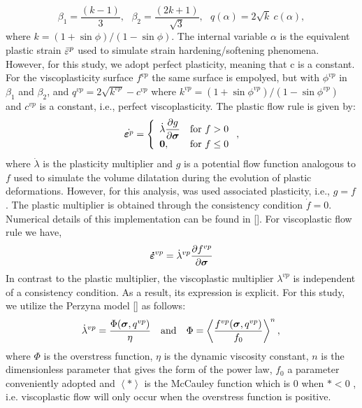 \documentclass[a4paper,fleqn]{cas-sc}
\begin{document}
\begin{equation}
	\label{eq:f_DP_inscrita_MC}
	\beta_1 = \dfrac{(k-1)}{3}, ~~~ \beta_2 = \dfrac{(2k+1)}{\sqrt{3}}, ~~~
	q(\alpha) = 2\sqrt{k}~c(\alpha),
\end{equation}
where $k = (1+\sin{\phi})/(1-\sin{\phi})$. The internal variable $\alpha$ is the equivalent plastic strain $\bar \varepsilon^p$ used to simulate strain hardening/softening phenomena. However, for this study, we adopt perfect plasticity, meaning that c is a constant. For the viscoplasticity surface $f^{vp}$ the same surface is empolyed, but with $\phi^{vp}$ in $\beta_1$ and $\beta_2$, and $q^{vp} = 2\sqrt{k^{vp}}-c^{vp}$ where $k^{vp} = (1+\sin{\phi^{vp}})/(1-\sin{\phi^{vp}})$ and $c^{vp}$ is a constant, i.e., perfect viscoplasticity. 
The plastic flow rule is given by:
\begin{equation}
	\label{eq_plastic_flow}
	\dot {\boldsymbol{\varepsilon}^{p}} = \left\{ 
	\begin{array}{ll} 
		\dot \lambda \dfrac{\partial g}{\partial \boldsymbol{\sigma}} &  \text{for } f > 0 \\ 
		\boldsymbol 0, & \text{for } f \le 0 \\
	\end{array}\right.,
\end{equation}
where $\dot \lambda$ is the plasticity multiplier and $g$ is a potential flow function analogous to $f$ used to simulate the volume dilatation during the evolution of plastic deformations. However, for this analysis, was used associated plasticity, i.e., $g=f$. The plastic multiplier is obtained through the consistency condition $\dot f = 0$. Numerical details of this implementation can be found in []. For viscoplastic flow rule we have,
\begin{equation}
	\label{eq_viscoplastic_flow}
	\boldsymbol{\dot{\varepsilon}}^{vp} = \dot \lambda^{vp} \dfrac{\partial f^{vp}}{\partial \boldsymbol{\sigma}}
\end{equation}
In contrast to the plastic multiplier, the viscoplastic multiplier $\lambda^{vp}$ is independent of a consistency condition. As a result, its expression is explicit. For this study, we utilize the Perzyna model [] as follows:
\begin{equation} \label{eq_perzyna_model}
	\dot \lambda^{vp} = \dfrac{\Phi(\boldsymbol{\sigma},q^{vp})}{\eta}~~~\text{and}~~~\Phi = \left\langle  \dfrac{f^{vp}(\boldsymbol{\sigma},q^{vp})}{f_0} \right\rangle^n, \,
\end{equation} where $\Phi$ is the overstress function, $\eta$ is the dynamic viscosity constant, $n$ is the dimensionless parameter that gives the form of the power law, $f_0$ a parameter conveniently adopted and $\left\langle * \right\rangle$ is the McCauley function which is $0$ when $* <0$ , i.e. viscoplastic flow will only occur when the overstress function is positive.
\end{document}
